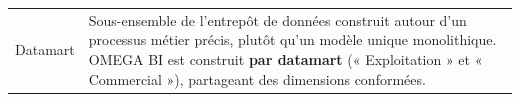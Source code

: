 \begin{longtable}{@{}>{\bfseries\raggedright}p{3.4cm} p{12.2cm}@{}}
\label{gloss:datamart}Datamart &
Sous-ensemble de l'entrepôt de données construit autour d'un processus
métier précis, plutôt qu'un modèle unique monolithique. OMEGA BI est
construit \textbf{par datamart} (« Exploitation » et « Commercial »),
partageant des dimensions conformées. \\

\end{longtable}
